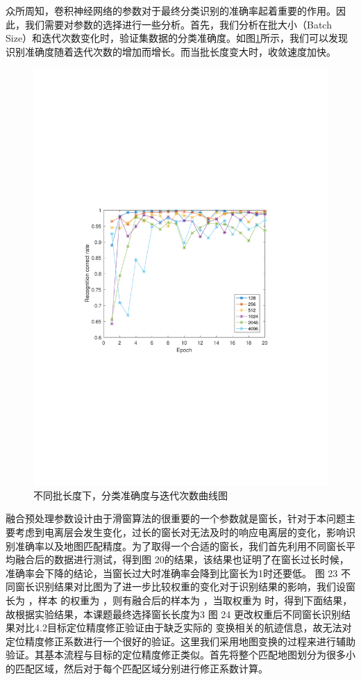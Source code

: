 众所周知，卷积神经网络的参数对于最终分类识别的准确率起着重要的作用。因此，我们需要对参数的选择进行一些分析。首先，我们分析在批大小（Batch Size）和迭代次数变化时，验证集数据的分类准确度。如图\ref{fig:epoch}所示，我们可以发现识别准确度随着迭代次数的增加而增长。而当批长度变大时，收敛速度加快。
\begin{figure}[!t]
	\centering
	\includegraphics[width=\textwidth]{figures/epoch}
	\caption{不同批长度下，分类准确度与迭代次数曲线图}
	\label{fig:epoch}
\end{figure}

融合预处理参数设计由于滑窗算法的很重要的一个参数就是窗长，针对于本问题主要考虑到电离层会发生变化，过长的窗长对无法及时的响应电离层的变化，影响识别准确率以及地图匹配精度。为了取得一个合适的窗长，我们首先利用不同窗长平均融合后的数据进行测试，得到图 20的结果，该结果也证明了在窗长过长时候，准确率会下降的结论，当窗长过大时准确率会降到比窗长为1时还要低。 图 23 不同窗长识别结果对比图为了进一步比较权重的变化对于识别结果的影响，我们设窗长为 ，样本 的权重为 ，则有融合后的样本为 ，当取权重为 时，得到下面结果，故根据实验结果，本课题最终选择窗长长度为3 图 24 更改权重后不同窗长识别结果对比4.2目标定位精度修正验证由于缺乏实际的 变换相关的航迹信息，故无法对定位精度修正系数进行一个很好的验证。这里我们采用地图变换的过程来进行辅助验证。其基本流程与目标的定位精度修正类似。首先将整个匹配地图划分为很多小的匹配区域，然后对于每个匹配区域分别进行修正系数计算。

